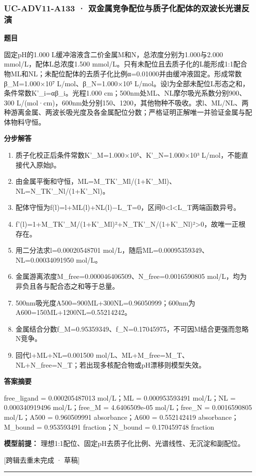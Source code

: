 \documentclass[UTF8,11pt,a4paper]{ctexart}
\begin{document}
\subsubsection*{UC-ADV11-A133 · 双金属竞争配位与质子化配体的双波长光谱反演}
\noindent\textbf{题目}\par
固定pH的1.000 L缓冲溶液含二价金属M和N，总浓度分别为1.000与2.000 mmol/L，配体L总浓度1.500 mmol/L。只有未配位且去质子化的L能形成1:1配合物ML和NL；未配位配体的去质子化比例α=0.01000并由缓冲液固定。形成常数β\_M=1.000×10⁷ L/mol、β\_N=1.000×10⁵ L/mol。设l为全部未配位L形态之和，条件常数K'\_i=αβ\_i。光程1.000 cm；500nm处ML、NL摩尔吸光系数分别900、300 L/(mol·cm)，600nm处分别150、1200，其他物种不吸收。求l、ML/NL、两种游离金属、两波长吸光度及各金属配位分数；严格证明正解唯一并验证金属与配体物料守恒。\par
\medskip\noindent\textbf{分步解答}
\begin{enumerate}
\item 质子化校正后条件常数K'\_M=1.000×10⁵、K'\_N=1.000×10³ L/mol，不能直接代入原始β。
\item 由金属平衡和守恒，ML=M\_TK'\_Ml/(1+K'\_Ml)、NL=N\_TK'\_Nl/(1+K'\_Nl)。
\item 配体守恒为f(l)=l+ML(l)+NL(l)−L\_T=0，区间0<l<L\_T两端函数异号。
\item f'(l)=1+M\_TK'\_M/(1+K'\_Ml)²+N\_TK'\_N/(1+K'\_Nl)²>0，故唯一正根存在。
\item 用二分法求l=0.00020548701 mol/L，随后ML=0.00095359349、NL=0.00034091950 mol/L。
\item 金属游离浓度M\_free=0.000046406509、N\_free=0.0016590805 mol/L，均为非负且各与配合态之和等于总量。
\item 500nm吸光度A500=900ML+300NL=0.96050999；600nm为A600=150ML+1200NL=0.55214242。
\item 金属结合分数f\_M=0.95359349、f\_N=0.17045975，不可因M结合更强而忽略N竞争。
\item 回代l+ML+NL=0.001500 mol/L、ML+M\_free=M\_T、NL+N\_free=N\_T；若出现多核配合物或pH漂移则模型失效。
\end{enumerate}
\noindent\textbf{答案摘要}\par
free\_ligand = 0.000205487013 mol/L；ML = 0.000953593491 mol/L；NL = 0.000340919496 mol/L；free\_M = 4.6406509e-05 mol/L；free\_N = 0.0016590805 mol/L；A500 = 0.960509991 absorbance；A600 = 0.552142419 absorbance；M\_bound = 0.953593491 fraction；N\_bound = 0.170459748 fraction\par
\noindent\textbf{模型前提：}
理想1:1配位、固定pH去质子化比例、光谱线性、无沉淀和副配位。\par
\noindent\textcolor{red!65!black}{[跨辑去重未完成 · 草稿]} \par
\medskip\hrule\medskip
\end{document}

